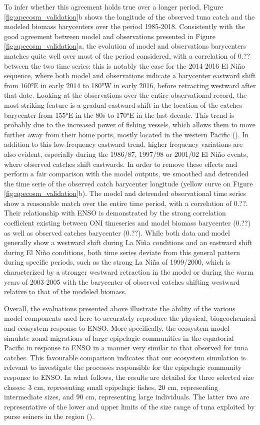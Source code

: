 To infer whether this agreement holds true over a longer period, Figure \ref{fig:apecosm_validation}b shows the longitude of the observed tuna catch and the modeled biomass barycenters over the period 1985-2018. Consistently with the good agreement between model and observations presented in Figure \ref{fig:apecosm_validation}a, the evolution of model and observations barycenters matches quite well over most of the period considered, with a correlation of 0.?? between the two time series: this is notably the case for the 2014-2016 El Niño sequence, where both model and observations indicate a barycenter eastward shift from 160°E in early 2014 to 180°W in early 2016, before retracting westward after that date. Looking at the observations over the entire observational record, the most striking feature is a gradual eastward shift in the location of the catches barycenter from 155°E in the 80s to 170°E in the last decade. This trend is probably due to the increased power of fishing vessels, which allows them to move further away from their home ports, mostly located in the western Pacific (). In addition to this low-frequency eastward trend, higher frequency variations are also evident, especially during the 1986/87, 1997/98 or 2001/02 El Niño events, where observed catches shift eastwards. In order to remove these effects and perform a fair comparison with the model outputs, we smoothed and detrended the time serie of the observed catch barycenter longitude (yellow curve on Figure \ref{fig:apecosm_validation}b). The model and detrended observational time series show a reasonable match over the entire time period, with a correlation of 0.??. Their relationship with ENSO is demonstrated by the strong correlation coefficient existing between ONI timeseries and model biomass barycenter (0.??) as well as observed catches barycenter (0.??). While both data and model generally show a westward shift during La Niña conditions and an eastward shift during El Niño conditions, both time series deviate from this general pattern during specific periods, such as the strong La Niña of 1999/2000, which is characterized by a stronger westward retraction in the model or during the warm years of 2003-2005 with the barycenter of observed catches shifting westward relative to that of the modeled biomass.

Overall, the evaluations presented above illustrate the ability of the various model components used here to accurately reproduce the physical, biogeochemical and ecosystem response to ENSO. More specifically, the ecosystem model simulate zonal migrations of large epipelagic communities in the equatorial Pacific in response to ENSO in a manner very similar to that observed for tuna catches. This favourable comparison indicates that our ecosystem simulation is relevant to investigate the processes responsible for the epipelagic community response to ENSO. In what follows, the results are detailed for three selected size classes: 3 cm, representing small epipelagic fishes, 20 cm, representing intermediate sizes, and 90 cm, representing large individuals. The latter two are representative of the lower and upper limits of the size range of tuna exploited by purse seiners in the region ().

\clearpage